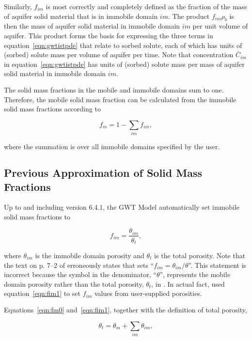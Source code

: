 Similarly, $f_{im}$ is most correctly and completely defined as the fraction of the mass of aquifer solid material that is in immobile domain $im$. The product $f_{im} \rho_b$ is then the mass of aquifer solid material in immobile domain $im$ per unit volume of aquifer. This product forms the basis for expressing the three terms in equation~\ref{eqn:gwtistpde} that relate to sorbed solute, each of which has units of (sorbed) solute mass per volume of aquifer per time. Note that concentration $\overline{C}_{im}$ in equation~\ref{eqn:gwtistpde} has units of (sorbed) solute mass per mass of aquifer solid material in immobile domain $im$.

The solid mass fractions in the mobile and immobile domains sum to one. Therefore, the mobile solid mass fraction can be calculated from the immobile solid mass fractions according to

\begin{equation}
\label{eqn:fm0}
f_m = 1 - \sum_{im}f_{im},
\end{equation}

\noindent where the summation is over all immobile domains specified by the user.

\subsection{Previous Approximation of Solid Mass Fractions} \label{sec:solidmassfrac1}

Up to and including \mf version 6.4.1, the GWT Model automatically set immobile solid mass fractions to

\begin{equation}
\label{eqn:fim1}
f_{im} = \frac{\theta_{im}}{\theta_t},
\end{equation}

\noindent where $\theta_{im}$ is the immobile domain porosity and $\theta_t$ is the total porosity. Note that the text on p. 7--2 of \cite{modflow6gwt} erroneously states that \mf sets ``$f_{im} = \theta_{im} / \theta$''. This statement is incorrect because the symbol in the denominator, ``$\theta$'', represents the mobile domain porosity rather than the total porosity, $\theta_t$, in \cite{modflow6gwt}. In actual fact, \mf used equation~\ref{eqn:fim1} to set $f_{im}$ values from user-supplied porosities.

Equations~\ref{eqn:fm0} and~\ref{eqn:fim1}, together with the definition of total porosity,

\begin{equation}
\label{eqn:thetat1}
\theta_t = \theta_m + \sum_{im}{\theta_{im}},
\end{equation}

